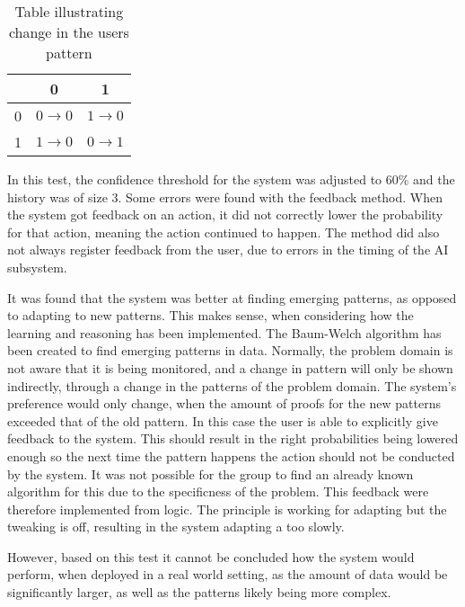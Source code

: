 \begin{table}[htbp]
\begin{center}
  \begin{tabular}{| c | c | c |}
    \hline
        & 0                 & 1                 \\ \hline
      0 & $0 \rightarrow 0$ & $1 \rightarrow 0$ \\ \hline
      1 & $1 \rightarrow 0$ & $0 \rightarrow 1$ \\
    \hline
  \end{tabular}
  \caption{Table illustrating change in the users pattern}\label{Table:userPatternChange}
\end{center}
\end{table}
In this test, the confidence threshold for the system was adjusted to 60\% and the history was of size 3.
Some errors were found with the feedback method. When the system got feedback on an action, it did not correctly lower the probability for that action, meaning the action continued to happen. The method did also not always register feedback from the user, due to errors in the timing of the AI subsystem.

It was found that the system was better at finding emerging patterns, as opposed to adapting to new patterns. This makes sense, when considering how the learning and reasoning has been implemented. The Baum-Welch algorithm has been created to find emerging patterns in data. Normally, the problem domain is not aware that it is being monitored, and a change in pattern will only be shown indirectly, through a change in the patterns of the problem domain. The system's preference would only change, when the amount of proofs for the new patterns exceeded that of the old pattern. In this case the user is able to explicitly give feedback to the system. This should result in the right probabilities being lowered enough so the next time the pattern happens the action should not be conducted by the system. It was not possible for the group to find an already known algorithm for this due to the specificness of the problem. This feedback were therefore implemented from logic. The principle is working for adapting but the tweaking is off, resulting in the system adapting a too slowly.

However, based on this test it cannot be concluded how the system would perform, when deployed in a real world setting, as the amount of data would be significantly larger, as well as the patterns likely being more complex.